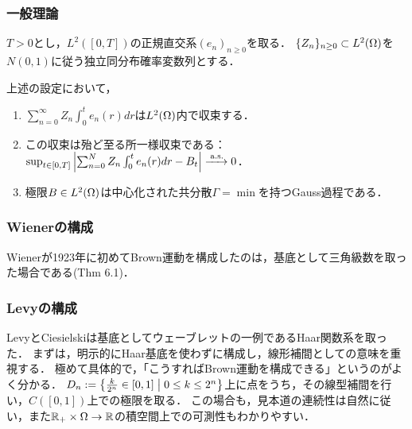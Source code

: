 \documentclass[uplatex,dvipdfmx]{jsreport}
\begin{document}
\subsubsection{一般理論}

\begin{notation}
    $T>0$とし，$L^2([0,T])$の正規直交系$(e_n)_{n\ge0}$を取る．
    $\{Z_n\}_{n\ge0}\subset L^2(\Omega)$を$N(0,1)$に従う独立同分布確率変数列とする．
\end{notation}

\begin{theorem}
    上述の設定において，
    \begin{enumerate}
        \item $\sum^\infty_{n=0}Z_n\int^t_0e_n(r)dr$は$L^2(\Omega)$内で収束する．
        \item この収束は殆ど至る所一様収束である：$\sup_{t\in[0,T]}\left|\sum^N_{n=0}Z_n\int^t_0e_n(r)dr-B_t\right|\xrightarrow{\;\mathrm{a.s.}}0$．
        \item 極限$B\in L^2(\Omega)$は中心化された共分散$\Gamma=\min$を持つGauss過程である．
    \end{enumerate}
\end{theorem}

\subsubsection{Wienerの構成}

\begin{tcolorbox}[colframe=ForestGreen, colback=ForestGreen!10!white,breakable,colbacktitle=ForestGreen!40!white,coltitle=black,fonttitle=\bfseries\sffamily,
title=]
    Wienerが1923年に初めてBrown運動を構成したのは，基底として三角級数を取った場合である\cite{Bass}(Thm 6.1)．
\end{tcolorbox}

\subsubsection{Levyの構成}

\begin{tcolorbox}[colframe=ForestGreen, colback=ForestGreen!10!white,breakable,colbacktitle=ForestGreen!40!white,coltitle=black,fonttitle=\bfseries\sffamily,
title=]
    LevyとCiesielskiは基底としてウェーブレットの一例であるHaar関数系を取った．
    まずは，明示的にHaar基底を使わずに構成し，線形補間としての意味を重視する．
    極めて具体的で，「こうすればBrown運動を構成できる」というのがよく分かる．
    $D_n:=\left\{\frac{k}{2^n}\in[0,1]\;\middle|\;0\le k\le 2^n\right\}$上に点をうち，その線型補間を行い，$C([0,1])$上での極限を取る．
    この場合も，見本道の連続性は自然に従い，また$\mathbb{R}_+\times\Omega\to\mathbb{R}$の積空間上での可測性もわかりやすい．
\end{tcolorbox}
\end{document}
